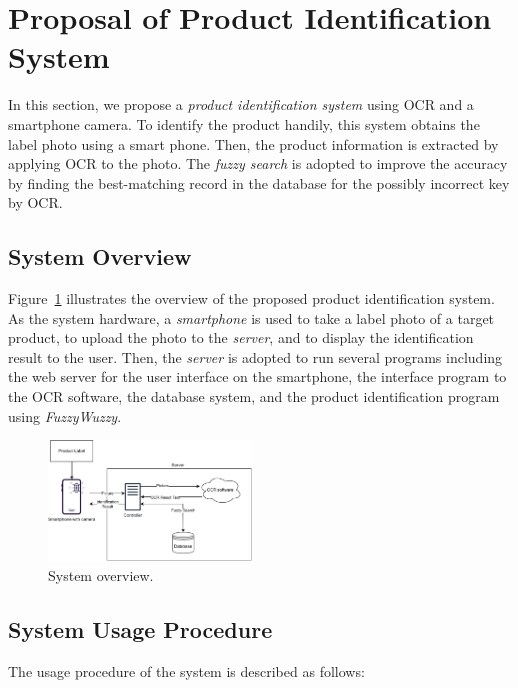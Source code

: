 \documentclass[technicalreport]{ieicej}
\begin{document}
\section{Proposal of Product Identification System}
\label{sec:proposal}
    In this section, we propose a {\em product identification system} using OCR and a smartphone camera. To identify the product handily, this system obtains the label photo using a smart phone. Then, the product information is extracted by applying OCR to the photo. The {\em fuzzy search} is adopted to improve the accuracy by finding the best-matching record in the database for the possibly incorrect key by OCR. 

    \subsection{System Overview}
        Figure~\ref{fig:system} illustrates the overview of the proposed product identification system. As the system hardware, a {\em smartphone} is used to take a label photo of a target product, to upload the photo to the {\em server}, and to display the identification result to the user. Then, the {\em server} is adopted to run several programs including the web server for the user interface on the smartphone, the interface program to the OCR software, the database system, and the product identification program using {\em FuzzyWuzzy}. 

        \begin{figure}[t] 
            \begin{center}
            \includegraphics[width=0.48\textwidth]{figure/system.pdf}
            \end{center}
            \caption{System overview.}
            \label{fig:system}
        \end{figure}

    \subsection{System Usage Procedure}
        The usage procedure of the system is described as follows:
\end{document}
